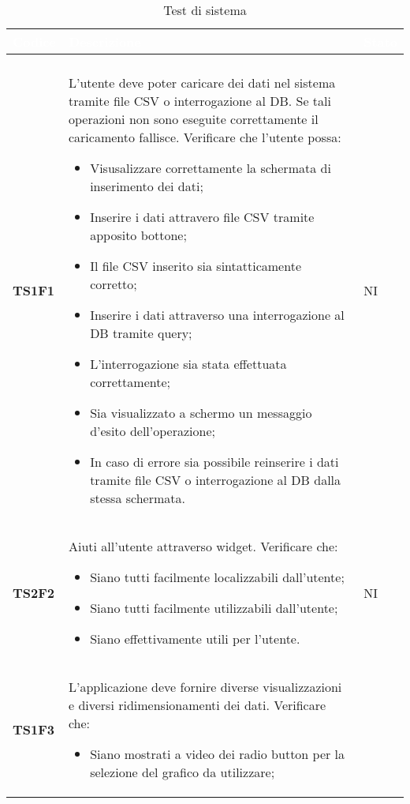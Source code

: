 \begin{longtable}{C{2.5cm} C{12cm} C{2cm}} 
		\textcolor{white}{\textbf{Codice}} & 
		\textcolor{white}{\textbf{Descrizione}} & 
		\textcolor{white}{\textbf{Stato}} \\
		\endfirsthead
		\\
	    \endfoot
	    \caption{Test di sistema}
	    \endlastfoot
		\hline
\textbf{TS1F1} & L'utente deve poter caricare dei dati nel sistema tramite file CSV o interrogazione al DB. Se tali operazioni non sono eseguite correttamente il caricamento fallisce. Verificare che l'utente possa: 
					\begin{itemize}
						\item Visusalizzare correttamente la schermata di inserimento dei dati;
						\item Inserire i dati attravero file CSV tramite apposito bottone;
						\item Il file CSV inserito sia sintatticamente corretto; 
						\item Inserire i dati attraverso una interrogazione al DB tramite query;
						\item L'interrogazione sia stata effettuata correttamente;
						\item Sia visualizzato a schermo un messaggio d'esito dell'operazione;
						\item In caso di errore sia possibile reinserire i dati tramite file CSV o interrogazione al DB dalla stessa schermata.
					\end{itemize}					 			    
			  & NI\\
\textbf{TS2F2} &  Aiuti all'utente attraverso widget. Verificare che:
					\begin{itemize}
						\item Siano tutti facilmente localizzabili dall'utente;
						\item Siano tutti facilmente utilizzabili dall'utente;
						\item Siano effettivamente utili per l'utente.
					\end{itemize}	
 			   & NI \\ 
\textbf{TS1F3} &  L'applicazione deve fornire diverse visualizzazioni e diversi ridimensionamenti dei dati. Verificare che: 
					\begin{itemize}
						\item Siano mostrati a video dei radio button per la selezione del grafico da utilizzare;

\end{itemize}
\end{longtable}
